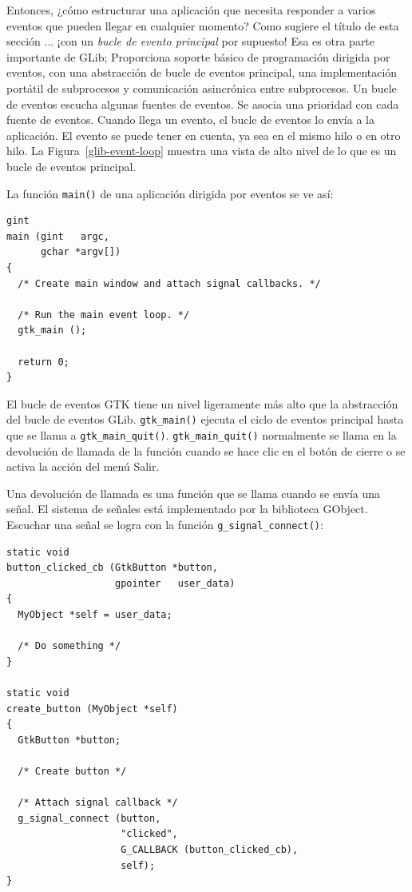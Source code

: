 Entonces, ¿cómo estructurar una aplicación que necesita responder a varios eventos que pueden llegar en cualquier momento? Como sugiere el título de esta sección ... ¡con un \emph{bucle de evento principal} por supuesto! Esa es otra parte importante de GLib; Proporciona soporte básico de programación dirigida por eventos, con una abstracción de bucle de eventos principal, una implementación portátil de subprocesos y comunicación asincrónica entre subprocesos. Un bucle de eventos escucha algunas fuentes de eventos. Se asocia una prioridad con cada fuente de eventos. Cuando llega un evento, el bucle de eventos lo envía a la aplicación. El evento se puede tener en cuenta, ya sea en el mismo hilo o en otro hilo. La Figura~\ref{glib-event-loop} muestra una vista de alto nivel de lo que es un bucle de eventos principal.

La función \lstinline{main()} de una aplicación dirigida por eventos se ve así:
\begin{lstlisting}
gint
main (gint   argc,
      gchar *argv[])
{
  /* Create main window and attach signal callbacks. */

  /* Run the main event loop. */
  gtk_main ();

  return 0;
}
\end{lstlisting}

El bucle de eventos GTK tiene un nivel ligeramente más alto que la abstracción del bucle de eventos GLib. \lstinline{gtk_main()} ejecuta el ciclo de eventos principal hasta que se llama a \lstinline{gtk_main_quit()}. \lstinline{gtk_main_quit()} normalmente se llama en la devolución de llamada de la función cuando se hace clic en el botón de cierre o se activa la acción del menú Salir.

Una devolución de llamada es una función que se llama cuando se envía una señal. El sistema de señales está implementado por la biblioteca GObject. Escuchar una señal se logra con la función \lstinline{g_signal_connect()}:
\begin{lstlisting}
static void
button_clicked_cb (GtkButton *button,
                   gpointer   user_data)
{
  MyObject *self = user_data;

  /* Do something */
}

static void
create_button (MyObject *self)
{
  GtkButton *button;

  /* Create button */

  /* Attach signal callback */
  g_signal_connect (button,
                    "clicked",
                    G_CALLBACK (button_clicked_cb),
                    self);
}
\end{lstlisting}

